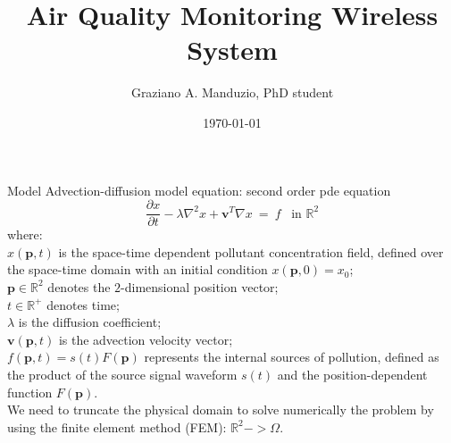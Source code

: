 \documentclass{beamer}
\title{Air Quality Monitoring Wireless System}
\author{Graziano A. Manduzio, PhD student}
\institute{University of Florence}
\date{\today}
\newcommand{\mb}{\mathbf}
\begin{document}
\begin{frame}
	\titlepage
\end{frame}
\begin{frame}{Model}
Advection-diffusion model equation: second order pde equation
\begin{equation}
		\displaystyle{\frac{\partial x}{\partial t}} - \lambda \nabla^2 x + \mb{v}^T \nabla x  ~=~ f \,\,\,\,\, \mbox{in } \mathbb{R}^2
\end{equation}
where:\\
	$x(\mb{p},t)$ is the space-time dependent pollutant concentration field, defined over the space-time domain with an initial condition $x(\mb{p},0)=x_{0}$;\\
	$\mb{p} \in \mathbb{R}^2$ denotes the $2$-dimensional position vector;\\
	$t \in \mathbb{R}^{+}$ denotes time;\\
	$\lambda$ is the diffusion coefficient;\\
	$\mb{v}(\mb{p},t)$ is the advection velocity vector;\\
	$f(\mb{p},t)=s(t)F(\mb{p})$ represents the internal sources of pollution, defined as the product of the source signal waveform $s(t)$ and the position-dependent function $F(\mb{p})$.\\
	We need to truncate the physical domain to solve numerically the problem by using the finite element method (FEM): $\mathbb{R}^2 -> \Omega$.
\end{frame}
\end{document}
